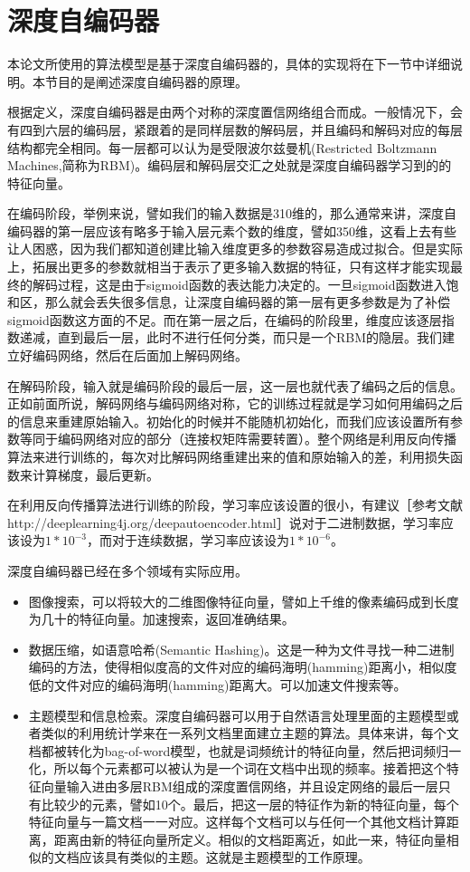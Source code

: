\section{深度自编码器}{
	本论文所使用的算法模型是基于深度自编码器的，具体的实现将在下一节中详细说明。本节目的是阐述深度自编码器的原理。
	
	根据定义，深度自编码器是由两个对称的深度置信网络组合而成。一般情况下，会有四到六层的编码层，紧跟着的是同样层数的解码层，并且编码和解码对应的每层结构都完全相同。每一层都可以认为是受限波尔兹曼机(Restricted Boltzmann Machines,简称为RBM)。编码层和解码层交汇之处就是深度自编码器学习到的的特征向量。
	
	
	在编码阶段，举例来说，譬如我们的输入数据是310维的，那么通常来讲，深度自编码器的第一层应该有略多于输入层元素个数的维度，譬如350维，这看上去有些让人困惑，因为我们都知道创建比输入维度更多的参数容易造成过拟合。但是实际上，拓展出更多的参数就相当于表示了更多输入数据的特征，只有这样才能实现最终的解码过程，这是由于sigmoid函数的表达能力决定的。一旦sigmoid函数进入饱和区，那么就会丢失很多信息，让深度自编码器的第一层有更多参数是为了补偿sigmoid函数这方面的不足。而在第一层之后，在编码的阶段里，维度应该逐层指数递减，直到最后一层，此时不进行任何分类，而只是一个RBM的隐层。我们建立好编码网络，然后在后面加上解码网络。
	
	在解码阶段，输入就是编码阶段的最后一层，这一层也就代表了编码之后的信息。正如前面所说，解码网络与编码网络对称，它的训练过程就是学习如何用编码之后的信息来重建原始输入。初始化的时候并不能随机初始化，而我们应该设置所有参数等同于编码网络对应的部分（连接权矩阵需要转置）。整个网络是利用反向传播算法来进行训练的，每次对比解码网络重建出来的值和原始输入的差，利用损失函数来计算梯度，最后更新。
	
	在利用反向传播算法进行训练的阶段，学习率应该设置的很小，有建议［参考文献http://deeplearning4j.org/deepautoencoder.html］说对于二进制数据，学习率应该设为$1 * 10^{-3}$，而对于连续数据，学习率应该设为$1 * 10^{-6}$。
	
	深度自编码器已经在多个领域有实际应用。
	\begin{itemize}
	\item 图像搜索，可以将较大的二维图像特征向量，譬如上千维的像素编码成到长度为几十的特征向量。加速搜索，返回准确结果。
	\item 数据压缩，如语意哈希(Semantic Hashing)。这是一种为文件寻找一种二进制编码的方法，使得相似度高的文件对应的编码海明(hamming)距离小，相似度低的文件对应的编码海明(hamming)距离大。可以加速文件搜索等。
	\item 主题模型和信息检索。深度自编码器可以用于自然语言处理里面的主题模型或者类似的利用统计学来在一系列文档里面建立主题的算法。具体来讲，每个文档都被转化为bag-of-word模型，也就是词频统计的特征向量，然后把词频归一化，所以每个元素都可以被认为是一个词在文档中出现的频率。接着把这个特征向量输入进由多层RBM组成的深度置信网络，并且设定网络的最后一层只有比较少的元素，譬如10个。最后，把这一层的特征作为新的特征向量，每个特征向量与一篇文档一一对应。这样每个文档可以与任何一个其他文档计算距离，距离由新的特征向量所定义。相似的文档距离近，如此一来，特征向量相似的文档应该具有类似的主题。这就是主题模型的工作原理。
	\end{itemize}
}
